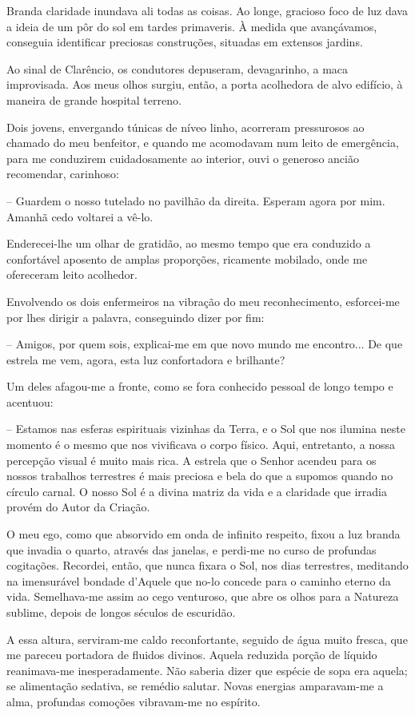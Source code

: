 \documentclass[portuguese,12pt,a4paper]{scrbook}
\begin{document}
	Branda claridade inundava ali todas as coisas. Ao longe, gracioso foco de luz dava a ideia de um pôr do sol em tardes primaveris. À medida que avançávamos, conseguia identificar preciosas construções, situadas em extensos jardins.
	
	Ao sinal de Clarêncio, os condutores depuseram, devagarinho, a maca improvisada. Aos meus olhos surgiu, então, a porta acolhedora de alvo edifício, à maneira de grande hospital terreno.
	
	Dois jovens, envergando túnicas de níveo linho, acorreram pressurosos ao chamado do meu benfeitor, e quando me acomodavam num leito de emergência, para me conduzirem cuidadosamente ao interior, ouvi o generoso ancião recomendar, carinhoso:
	
	– Guardem o nosso tutelado no pavilhão da direita. Esperam agora por mim. Amanhã cedo voltarei a vê-lo.
	
	Enderecei-lhe um olhar de gratidão, ao mesmo tempo que era conduzido a confortável aposento de amplas proporções, ricamente mobilado, onde me ofereceram leito acolhedor.
	
	Envolvendo os dois enfermeiros na vibração do meu reconhecimento, esforcei-me por lhes dirigir a palavra, conseguindo dizer por fim:
	
	
	– Amigos, por quem sois, explicai-me em que novo mundo me encontro... De que estrela me vem, agora, esta luz confortadora e brilhante?
	
	Um deles afagou-me a fronte, como se fora conhecido pessoal de longo tempo e acentuou:
	
	– Estamos nas esferas espirituais vizinhas da Terra, e o Sol que nos ilumina neste momento é o mesmo que nos vivificava o corpo físico. Aqui, entretanto, a nossa percepção visual é muito mais rica. A estrela que o Senhor acendeu para os nossos trabalhos terrestres é mais preciosa e bela do que a supomos quando no círculo carnal. O nosso Sol é a divina matriz da vida e a claridade que irradia provém do Autor da Criação.
	
	O meu ego, como que absorvido em onda de infinito respeito, fixou a luz branda que invadia o quarto, através das janelas, e perdi-me no curso de profundas cogitações. Recordei, então, que nunca fixara o Sol, nos dias terrestres, meditando na imensurável bondade d'Aquele que no-lo concede para o caminho eterno da vida. Semelhava-me assim ao cego venturoso, que abre os olhos para a Natureza sublime, depois de longos séculos de escuridão.
	
	A essa altura, serviram-me caldo reconfortante, seguido de água muito fresca, que me pareceu portadora de fluidos divinos. Aquela reduzida porção de líquido reanimava-me inesperadamente. Não saberia dizer que espécie de sopa era aquela; se alimentação sedativa, se remédio salutar. Novas energias amparavam-me a alma, profundas comoções vibravam-me no espírito.
	
\end{document}
